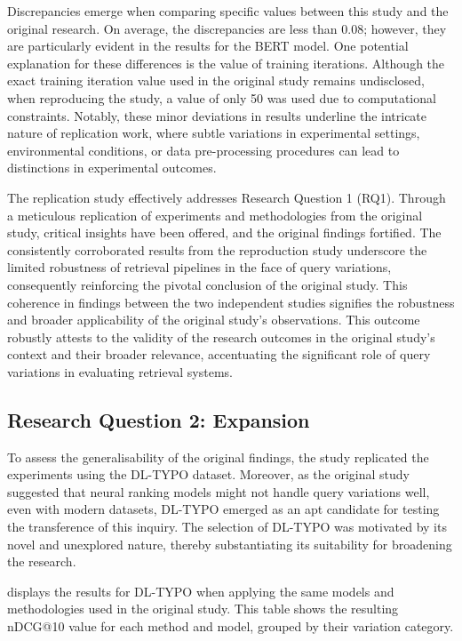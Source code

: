 Discrepancies emerge when comparing specific values between this study and the original research. On average, the discrepancies are less than 0.08; however, they are particularly evident in the results for the BERT model. One potential explanation for these differences is the value of training iterations. Although the exact training iteration value used in the original study remains undisclosed, when reproducing the study, a value of only 50 was used due to computational constraints. Notably, these minor deviations in results underline the intricate nature of replication work, where subtle variations in experimental settings, environmental conditions, or data pre-processing procedures can lead to distinctions in experimental outcomes.

The replication study effectively addresses Research Question 1 (RQ1). Through a meticulous replication of experiments and methodologies from the original study, critical insights have been offered, and the original findings fortified. The consistently corroborated results from the reproduction study underscore the limited robustness of retrieval pipelines in the face of query variations, consequently reinforcing the pivotal conclusion of the original study. This coherence in findings between the two independent studies signifies the robustness and broader applicability of the original study's observations. This outcome robustly attests to the validity of the research outcomes in the original study's context and their broader relevance, accentuating the significant role of query variations in evaluating retrieval systems.

\subsection{Research Question 2: Expansion}
To assess the generalisability of the original findings, the study replicated the experiments using the DL-TYPO dataset. Moreover, as the original study suggested that neural ranking models might not handle query variations well, even with modern datasets, DL-TYPO emerged as an apt candidate for testing the transference of this inquiry. The selection of DL-TYPO was motivated by its novel and unexplored nature, thereby substantiating its suitability for broadening the research.



 displays the results for DL-TYPO when applying the same models and methodologies used in the original study. This table shows the resulting nDCG@10 value for each method and model, grouped by their variation category.

